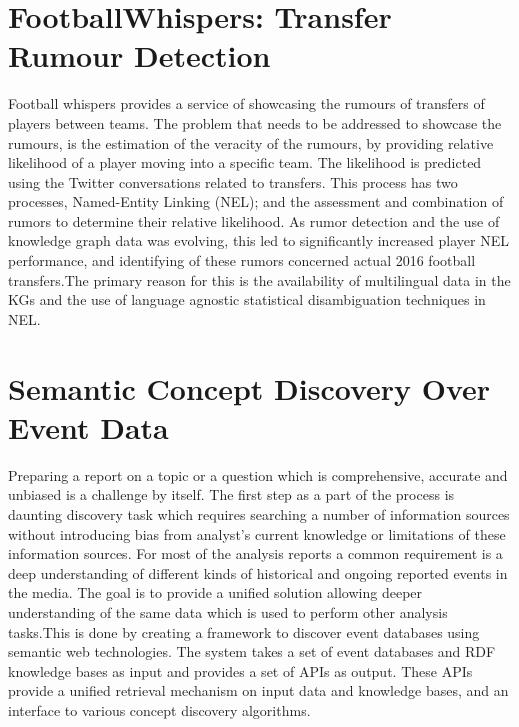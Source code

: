     \section{FootballWhispers: Transfer Rumour Detection}

    
    Football whispers  provides a service of showcasing the rumours of  transfers of players between teams. The problem that needs to be addressed to showcase the rumours, is the estimation of the veracity of the rumours, by providing relative likelihood of a player moving into a specific team.
    The likelihood is predicted using the Twitter conversations related to transfers. This process has two processes, Named-Entity Linking (NEL); and the assessment and combination of rumors to determine their relative likelihood. 
    As rumor detection and the use of knowledge graph data was evolving, this led to significantly increased player NEL performance, and identifying of these rumors concerned actual 2016 football transfers.The primary reason for this is the availability of multilingual data in the KGs and the use of language agnostic statistical disambiguation techniques in NEL.
 

    \section{Semantic Concept Discovery Over Event Data}

    Preparing a report on a topic or a question which is comprehensive, accurate and unbiased is a challenge by itself. The first step as a part of the process is daunting discovery task which requires searching a number of information sources without introducing bias from analyst’s current knowledge or limitations of these information sources. For most of the analysis reports a common requirement is a deep understanding of different kinds of historical and ongoing reported events in the media.
    The goal is to provide a unified solution allowing deeper understanding of the same data which is used to perform other analysis tasks.This is done by creating a framework to discover event databases using semantic web technologies.
    The system takes a set of event databases and RDF knowledge bases as input and provides a set of APIs as output. These APIs provide a unified retrieval mechanism on input data and knowledge bases, and an interface to various concept discovery algorithms.

